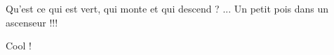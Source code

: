 Qu'est ce qui est vert, qui monte et qui descend ?
... Un petit pois dans un ascenseur !!! 

Cool ! 